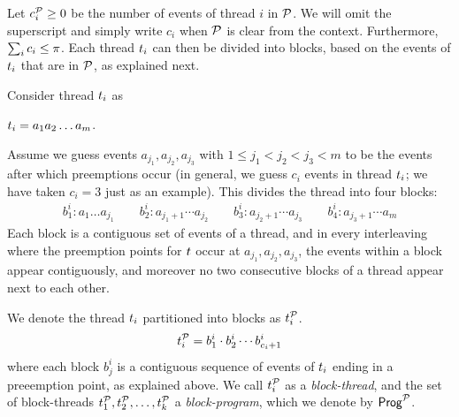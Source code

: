 Let $c^{\mathcal{P}}_i \ge 0$ be the number of events of thread $i$ in $\mathcal{P}$. 
We will omit the superscript and simply write $c_i$ when $\mathcal{P}$ is clear from the context. Furthermore,  $\sum_{i} c_i \le \pi$. Each thread $t_i$ can then be divided into blocks, based on the events of $t_i$ that are in $\mathcal{P}$, as explained next.


Consider thread $t_i$ as 

 $t_i = a_1 a_2 \dots a_m$.

Assume we guess events $a_{j_1}, a_{j_2}, a_{j_3}$ with $1 \le j_1 < j_2 < j_3 < m$ to be the events after which preemptions occur (in general, we guess $c_i$ events in thread $t_i$; we have taken $c_i = 3$ just as an example). This divides the thread into four blocks:
\begin{align*}
b^i_1: a_1 \dots a_{j_1} \qquad b^i_2: a_{j_1 + 1} \cdots a_{j_2} \qquad b^i_3: a_{j_2 + 1} \cdots a_{j_3} \qquad b^i_4: a_{j_3 + 1} \cdots a_m
\end{align*}
Each block is a contiguous set of events of a thread, and in every interleaving where the preemption points for $t$ occur at $a_{j_1}, a_{j_2}, a_{j_3}$, the events within a block appear contiguously, and moreover no two consecutive blocks of a thread appear next to each other. 

We denote the thread $t_i$ partitioned into blocks as $t_i^{\mathcal{P}}$. 
\begin{align*}
    t^{\mathcal{P}}_i = b^i_1 \cdot b^i_2 \cdots b^i_{c_i + 1}
\end{align*}
where each block $b^i_j$ is a contiguous sequence of events of $t_i$ ending in a preeemption point, as explained above. We call $t^{\mathcal{P}}_i$ as a \emph{block-thread}, and the set of block-threads $t^{\mathcal{P}}_1, t^{\mathcal{P}}_2, \dots, t^{\mathcal{P}}_k$ a \emph{block-program}, which we denote by $\mathsf{Prog}^{\mathcal{P}}$.

